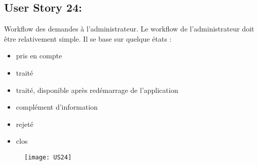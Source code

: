 \newpage
\subsection{User Story 24:}
Workflow des demandes à l'administrateur.  Le workflow de l'administrateur doit être relativement
simple. Il se base sur quelque états :

\begin{itemize}
  \item pris en compte
  \item traité
  \item traité, disponible après redémarrage de l'application
  \item complément d'information
  \item rejeté
  \item clos
\end{itemize}


\begin{figure}[!h]
  \begin{center}
        \texttt{[image: US24]}
        \label{US24-dia}
  \end{center}
\end{figure}